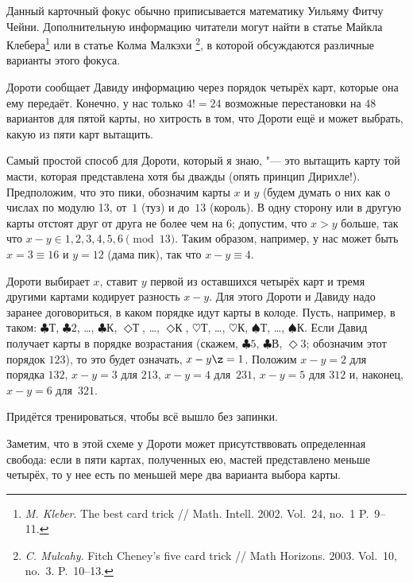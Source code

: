 \documentclass[twoside]{book}
\begin{document}
Данный карточный фокус обычно приписывается математику Уильяму Фитчу Чейни. %
Дополнительную информацию читатели могут найти в статье Майкла Клебера\footnote{\emph{M. Kleber}. The best card trick /\!/ {Math. Intell.} 2002. Vol.~24, no.~1 P.~9--11.}
или в статье Колма Малкэхи%
\footnote{\emph{C. Mulcahy}. Fitch Cheney's five card trick /\!/ {Math Horizons}. 2003. Vol.~10, no.~3. P.~10--13.}, в которой обсуждаются различные варианты этого фокуса.

\medskip

Дороти сообщает Давиду информацию через порядок четырёх карт, которые она ему передаёт.
Конечно, у нас только $4!=24$ возможные перестановки на $48$ вариантов
для пятой карты, но хитрость в том, что Дороти ещё и может выбрать, какую из пяти карт вытащить.

Самый простой способ для Дороти, который я знаю, "--- это вытащить карту той масти, которая представлена хотя бы дважды (опять принцип Дирихле!).
Предположим, что это пики, обозначим карты $x$ и $y$ (будем думать о
них как о числах по модулю 13, от~$1$ (туз) и до~$13$ (король).
В одну сторону или в другую карты отстоят друг от друга не более чем на 6;
допустим, что $x>y$ больше, так что $x-y\in {1,2,3,4,5,6} \pmod{13}$.
Таким образом, например, у нас может быть $x =3\equiv 16$ и $y = 12$ (дама пик), так что $x-y\equiv4$.

Дороти выбирает $x$, ставит $y$ первой из оставшихся четырёх карт и тремя другими картами кодирует разность $x-y$.
Для этого Дороти и Давиду надо заранее договориться, в каком порядке
идут карты в колоде. Пусть, например, в таком: 
$\clubsuit\text{Т}$,
$\clubsuit 2$,
\dots,
$\clubsuit\text{К}$,
$\Diamond\text{Т}$,
\dots,
$\Diamond\text{К}$,
$\heartsuit\text{Т}$,
\dots,
$\heartsuit\text{К}$,
$\spadesuit \text{Т}$,
\dots,
$\spadesuit \text{К}$.
Если Давид получает карты в порядке возрастания (скажем, 
$\clubsuit 5$,
$\clubsuit \text{В}$,
$\Diamond 3$; обозначим этот порядок $123$), то это будет означать, $x-y\z=1$.
Положим $x-y=2$ для порядка $132$,
$x-y=3$ для $213$, $x-y=4$ для~$231$, $x-y=5$ для $312$ и, наконец, $x-y=6$ для~$321$.

Придётся тренироваться, чтобы всё вышло без запинки.

\medskip

Заметим, что в этой схеме у Дороти может присутстввовать определенная
свобода: если в пяти картах, полученных ею, мастей представлено меньше
четырёх, то у нее есть по меньшей мере два варианта выбора карты.
\end{document}
